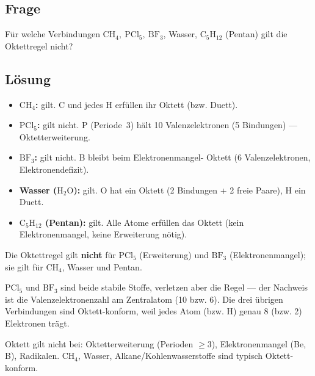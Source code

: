 
\subsection*{Frage}
Für welche Verbindungen $\mathrm{CH_4,\ PCl_5,\ BF_3}$, Wasser, $\mathrm{C_5H_12}$
(Pentan) gilt die Oktettregel nicht?

\subsection*{Lösung}
\begin{itemize}
  \item \textbf{$\mathrm{CH_4}$:} gilt. C und jedes H erfüllen ihr Oktett (bzw.
        Duett).
  \item \textbf{$\mathrm{PCl_5}$:} gilt nicht. P (Periode~3) hält 10
        Valenzelektronen (5 Bindungen) --- Oktetterweiterung.
  \item \textbf{$\mathrm{BF_3}$:} gilt nicht. B bleibt beim Elektronenmangel-
        Oktett ($6$ Valenzelektronen, Elektronendefizit).
  \item \textbf{Wasser ($\mathrm{H_2O}$):} gilt. O hat ein Oktett (2
        Bindungen + 2 freie Paare), H ein Duett.
  \item \textbf{$\mathrm{C_5H_{12}}$ (Pentan):} gilt. Alle Atome erfüllen das
        Oktett (kein Elektronenmangel, keine Erweiterung nötig).
\end{itemize}

\begin{ergebnis}
Die Oktettregel gilt \textbf{nicht} für $\mathrm{PCl_5}$ (Erweiterung) und
$\mathrm{BF_3}$ (Elektronenmangel); sie gilt für $\mathrm{CH_4}$, Wasser und
Pentan.
\end{ergebnis}

\begin{kontrolle}
$\mathrm{PCl_5}$ und $\mathrm{BF_3}$ sind beide stabile Stoffe, verletzen aber
die Regel --- der Nachweis ist die Valenzelektronenzahl am Zentralatom (10 bzw.
6). Die drei übrigen Verbindungen sind Oktett-konform, weil jedes Atom (bzw. H)
genau 8 (bzw. 2) Elektronen trägt.
\end{kontrolle}

\begin{merksatz}
Oktett gilt nicht bei: Oktetterweiterung (Perioden $\ge 3$), Elektronenmangel
(Be, B), Radikalen. $\mathrm{CH_4}$, Wasser, Alkane/Kohlenwasserstoffe sind
typisch Oktett-konform.
\end{merksatz}
